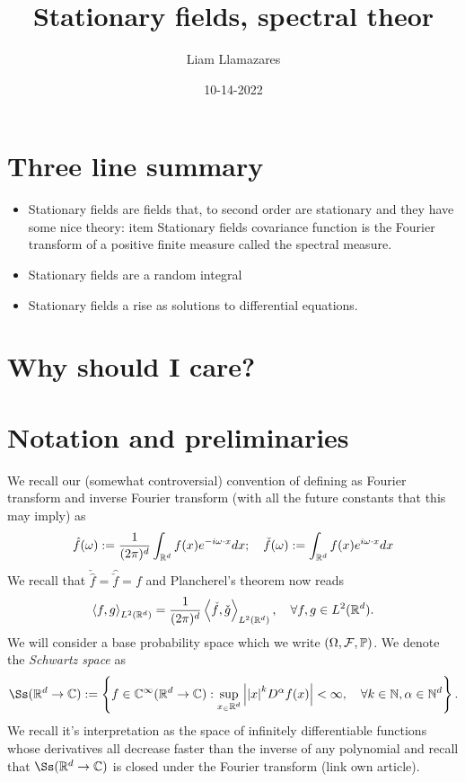 \documentclass[12pt]{article}
\newcommand{\br}[1]{\left\langle#1\right\rangle}
\begin{document}
\begin{CJK*}{UTF8}{gbsn}
	\title{Stationary fields, spectral theor}
	\author{Liam Llamazares}
	\date{10-14-2022}
	\maketitle
	\section{ Three line summary }
	\begin{itemize}
		\item Stationary fields are fields that, to second order are stationary and they have some nice theory:
		      item Stationary fields covariance function is the Fourier transform of a positive finite measure called the spectral measure.
		\item Stationary fields are a random integral
		\item Stationary fields a rise as solutions to differential equations.
	\end{itemize}
	\section{Why should I care?}

	\section{Notation and preliminaries}
	We recall our (somewhat controversial) convention of defining as Fourier transform and inverse Fourier transform (with all the future constants that this may imply) as
	\begin{equation*}
		\hat{f}(\omega):=\frac{1}{(2\pi)^d}\int_{{\mathbb R}^d}f(x)e^{-i\omega\cdot x} dx;\quad \check{f}(\omega):=\int_{{\mathbb R}^d}f(x)e^{i\omega\cdot x} dx
	\end{equation*}
	We recall that $\check{\hat{f}}=\hat{\check{f}}=f$ and Plancherel's theorem now reads
	\begin{equation*}
		\br{f,g}_{L^2(\R^d)}=\frac{1}{(2\pi )^d}\br{\check{f},\check{g}}_{L^2(\R^d)}, \quad\forall f,g\in L^2(\R^d).
	\end{equation*}
	We will consider a base probability space which we write $(\Omega,\mathcal{F},\mathbb{P})$.
	We denote the \emph{Schwartz space} as
	\begin{equation*}
		\Ss(\R^d\to\C):=\left\{f\in \C^\infty(\R^d \to \C): \sup_{x_\in \R^d}\abs{\abs{x}^kD^\alpha f(x)}<\infty , \quad\forall k\in \N,\alpha \in \N^d\right\}.
	\end{equation*}
	We recall it's interpretation as the space of infinitely differentiable functions whose derivatives all decrease faster than the inverse of any polynomial and recall that $\Ss(\R^d\to\C)$ is closed under the Fourier transform (link own article).


\end{CJK*}
\end{document}
